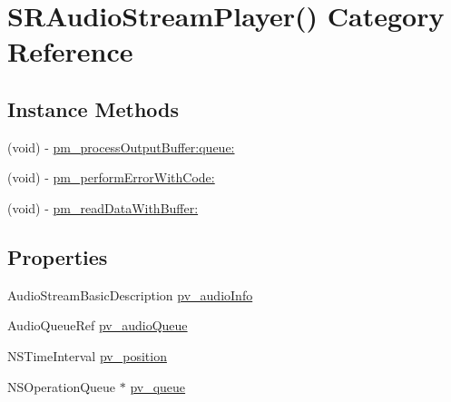 \hypertarget{category_s_r_audio_stream_player_07_08}{\section{S\-R\-Audio\-Stream\-Player() Category Reference}
\label{category_s_r_audio_stream_player_07_08}
}
\subsection*{Instance Methods}
\begin{DoxyCompactItemize}
\item 
(void) -\/ \hyperlink{category_s_r_audio_stream_player_07_08_ae8afff8d6085636ca352d26131ca2ba0}{pm\-\_\-process\-Output\-Buffer\-:queue\-:}
\item 
(void) -\/ \hyperlink{category_s_r_audio_stream_player_07_08_a63d1c5efc90f7afdba03ef3f386e960c}{pm\-\_\-perform\-Error\-With\-Code\-:}
\item 
(void) -\/ \hyperlink{category_s_r_audio_stream_player_07_08_a2ecfde2430f5bec5ac4f8d263125ad2e}{pm\-\_\-read\-Data\-With\-Buffer\-:}
\end{DoxyCompactItemize}
\subsection*{Properties}
\begin{DoxyCompactItemize}
\item 
Audio\-Stream\-Basic\-Description \hyperlink{category_s_r_audio_stream_player_07_08_a5715f076294380db598c740701400ee2}{pv\-\_\-audio\-Info}
\item 
Audio\-Queue\-Ref \hyperlink{category_s_r_audio_stream_player_07_08_a0ee5901e8d09543ee120e13ce6484471}{pv\-\_\-audio\-Queue}
\item 
N\-S\-Time\-Interval \hyperlink{category_s_r_audio_stream_player_07_08_aa6fed21c7e554d8c945aa526e10cdfb8}{pv\-\_\-position}
\item 
N\-S\-Operation\-Queue $\ast$ \hyperlink{category_s_r_audio_stream_player_07_08_ad28b5a7e377666314211c6d8d66aa566}{pv\-\_\-queue}
\end{DoxyCompactItemize}


